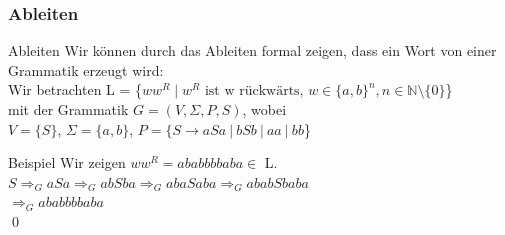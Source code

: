 \subsubsection{Ableiten}
\begin{frame}[fragile]{Ableiten}
    Wir können durch das Ableiten formal zeigen, dass ein Wort von einer Grammatik erzeugt wird:\\
    \small{Wir betrachten L = \{$ww^R \mid w^R\text{ ist w rückwärts, }w \in \{a, b\}^n, n\in \mathbb{N}\setminus \{0\}$\}\\
        mit der Grammatik $G=(V,\Sigma,P,S)$, wobei\\
        $V=\{S\}$, $\Sigma=\{a,b\}$, $P = \{S \rightarrow aSa \ |\ bSb \ |\ aa \ |\ bb$\}}
    \begin{exampleblock}{Beispiel}
        Wir zeigen $ww^R = ababbbbaba \in$ L.\\
        \small{$S\Rightarrow_G aSa \Rightarrow_G abSba \Rightarrow_G  abaSaba \Rightarrow_G ababSbaba$ \\ $\Rightarrow_G ababbbbaba$}\\\qed
    \end{exampleblock}
\end{frame}

